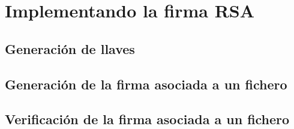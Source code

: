 \documentclass[12pt, spanish]{article}
\begin{document}
\section{Implementando la firma RSA}

\subsection{Generación de llaves}

\subsection{Generación de la firma asociada a un fichero}

\subsection{Verificación de la firma asociada a un fichero}
\end{document}
